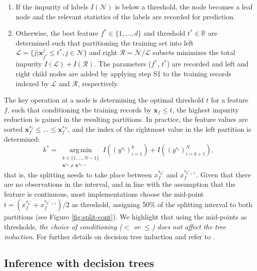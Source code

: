 \documentclass[sn-mathphys]{sn-jnl}%
\DeclareMathOperator*{\argmin}{arg\,min}
\theoremstyle{thmstyleone}%
\theoremstyle{thmstyletwo}%
\theoremstyle{thmstylethree}%
\begin{document}
\begin{enumerate}
\item [S1] If the impurity of labels $I(\mathcal{N})$ is below a threshold, the node becomes a leaf node and the relevant statistics of the labels are recorded for prediction.
\item [S2] Otherwise, the best feature $f^* \in \lbrace 1, \dots, d\rbrace$ and threshold $t^* \in \mathbb{R}$ are determined  
such that partitioning the training set into left $\mathcal{L} = \lbrace j \vert  \mathbf{x}^j_{f^*} \leq t^*, j \in \mathcal{N}\rbrace$ and right $\mathcal{R} = \mathcal{N}/\mathcal{L}$ subsets minimizes the total impurity $I(\mathcal{L}) + I(\mathcal{R})$. The parameters ($f^*$, $t^*$) are recorded and left and right child nodes are added by applying step S1 to the training records indexed by $\mathcal{L}$ and $\mathcal{R}$, respectively.
\end{enumerate}
The key operation at a node is determining the optimal threshold $t$ for a feature $f$, such that conditioning the training records by $\mathbf{x}_f \leq t$, the highest impurity reduction is gained in the resulting partitions.
In practice, the feature values are sorted $\mathbf{x}^{s_1}_f \leq \dots \leq \mathbf{x}^{s_N}_f$, and the index of the rightmost value in the left partition is determined:
\begin{equation}
k^* = \argmin\limits_{\substack{k \in \lbrace 1, \dots, N - 1 \rbrace\\ \mathbf{x}^{s_{k}} \neq \mathbf{x}^{s_{k + 1}}}}I((y^{s_i})_{i=1}^{k}) + I((y^{s_i})_{i=k+1}^{N}),
\end{equation}
that is, the splitting needs to take place between $x^{s_{k^*}}_f$ and $x^{s_{k^* + 1}}_f$. 
Given that there are no observations in the interval, and in line with the assumption that the feature is continuous, most implementations choose the mid-point $t = (x^{s_{k^*}}_f + x^{s_{k^* + 1}}_f)/2$ as threshold, assigning 50\% of the splitting interval to both partitions (see Figure \ref{fig:split-cont}). We highlight that using the mid-points as thresholds, \emph{the choice of conditioning ($<$ or $\leq$) does not affect the tree induction}.
For further details on decision tree induction and  refer to \citep{treebook}.

\subsection{Inference with decision trees}
\label{sec:problem-split}
\end{document}

